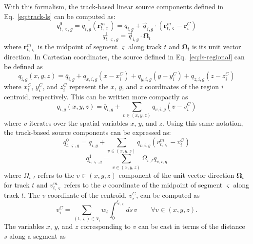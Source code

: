 With this formalism, the track-based linear source components defined in Eq.~\ref{eq:track-ls} can be computed as:
\begin{equation}
q^0_{t,\varsigma,g} = q_{i,g}(\mathbf{r}^m_{t,\varsigma}) = \overline{q}_{i,g} + \vec{q}_{i,g} \cdot \left( \mathbf{r}^m_{t,\varsigma} - \mathbf{r}^C_i \right)
\end{equation}
\begin{equation}
q^1_{t,\varsigma,g} = \vec{q}_{i,g} \cdot \mathbf{\Omega}_t
\end{equation}
where $\mathbf{r}^m_{t,\varsigma}$ is the midpoint of segment $\varsigma$ along track $t$ and $\mathbf{\Omega}_t$ is its unit vector direction. In Cartesian coordinates, the source defined in Eq.~\ref{eq:ls-regional} can be defined as
\begin{equation}
q_{i,g}(x, y, z) = \overline{q}_{i,g} + q_{x,i,g} \left( x - x^C_i \right) + q_{y,i,g} \left( y - y^C_i \right) + q_{z,i,g} \left( z - z^C_i \right)
\end{equation}
where $x^C_i$, $y^C_i$, and $z^C_i$ represent the $x$, $y$, and $z$ coordinates of the region $i$ centroid, respectively. This can be written more compactly as
\begin{equation}
q_{i,g}(x, y, z) = \overline{q}_{i,g} + \sum_{v \in (x,y,z)} q_{v,i,g} \left( v - v^C_i \right)
\end{equation}
where $v$ iterates over the spatial variables $x$, $y$, and $z$. Using this same notation, the track-based source components can be expressed as:
\begin{equation}
q^0_{t,\varsigma,g} = \overline{q}_{i,g} + \sum_{v \in (x,y,z)} q_{v,i,g} \left( v^m_{t,\varsigma} - v^C_i \right)
\label{eq:q0-def}
\end{equation}
\begin{equation}
q^1_{t,\varsigma,g} = \sum_{v \in (x,y,z)} \Omega_{v,t} q_{v,i,g}
\label{eq:q1-def}
\end{equation}
where $\Omega_{v,t}$ refers to the $v\in(x,y,z)$ component of the unit vector direction $\mathbf{\Omega}_t$ for track $t$ and $v^m_{t,\varsigma}$ refers to the $v$ coordinate of the midpoint of segment $\varsigma$ along track $t$. The $v$ coordinate of the centroid, $v^C_i$, can be computed as
\begin{equation}
v^C_i = \sum_{(t,\varsigma) \in V_i} w_t \int_{0}^{\ell_{t,\varsigma}} ds \, v \qquad \forall v \in (x,y,z).
\label{eq:gen-centroid-int}
\end{equation}
The variables $x$, $y$, and $z$ corresponding to $v$ can be cast in terms of the distance $s$ along a segment as
